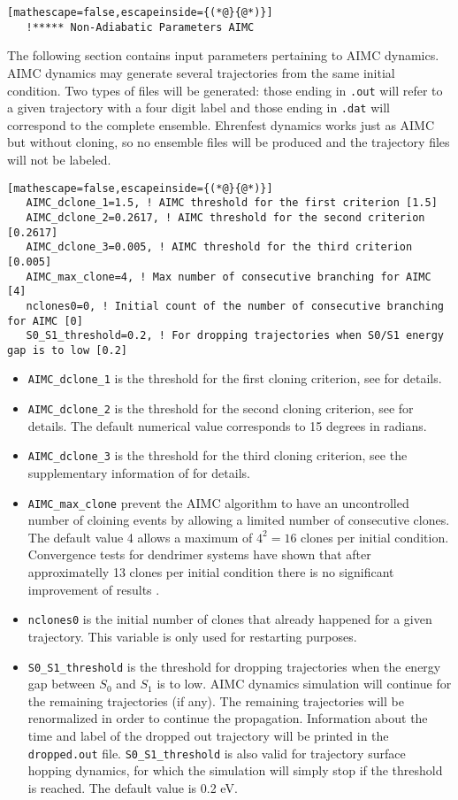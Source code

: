\begin{lstlisting}[mathescape=false,escapeinside={(*@}{@*)}]
   !***** Non-Adiabatic Parameters AIMC
\end{lstlisting}
\noindent The following section contains input parameters pertaining to AIMC dynamics. AIMC dynamics may generate several trajectories from the same initial condition. Two types of files will be generated: those ending in \verb+.out+ will refer to a given trajectory with a four digit label and those ending in \verb+.dat+ will correspond to the complete ensemble. Ehrenfest dynamics works just as AIMC but without cloning, so no ensemble files will be produced and the trajectory files will not be labeled.
\begin{lstlisting}[mathescape=false,escapeinside={(*@}{@*)}]
   AIMC_dclone_1=1.5, ! AIMC threshold for the first criterion [1.5]
   AIMC_dclone_2=0.2617, ! AIMC threshold for the second criterion [0.2617]
   AIMC_dclone_3=0.005, ! AIMC threshold for the third criterion [0.005]
   AIMC_max_clone=4, ! Max number of consecutive branching for AIMC [4]
   nclones0=0, ! Initial count of the number of consecutive branching for AIMC [0]
   S0_S1_threshold=0.2, ! For dropping trajectories when S0/S1 energy gap is to low [0.2]
\end{lstlisting}
\begin{itemize}
    \item \verb+AIMC_dclone_1+ is the threshold for the first cloning criterion, see \cite{freixas2018ab} for details.
    \item \verb+AIMC_dclone_2+ is the threshold for the second cloning criterion, see \cite{freixas2018ab} for details. The default numerical value corresponds to 15 degrees in radians.
    \item \verb+AIMC_dclone_3+ is the threshold for the third cloning criterion, see the supplementary information of \cite{lemus2022ultrafast} for details.
    \item \verb+AIMC_max_clone+ prevent the AIMC algorithm to have an uncontrolled number of cloining events by allowing a limited number of consecutive clones. The default value 4 allows a maximum of $4^2=16$ clones per initial condition. Convergence tests for dendrimer systems have shown that after approximatelly 13 clones per initial condition there is no significant improvement of results \cite{freixas2021nonadiabatic}.
    \item \verb+nclones0+ is the initial number of clones that already happened for a given trajectory. This variable is only used for restarting purposes.
    \item \verb+S0_S1_threshold+ is the threshold for dropping trajectories when the energy gap between $S_0$ and $S_1$ is to low. AIMC dynamics simulation will continue for the remaining trajectories (if any). The remaining trajectories will be renormalized in order to continue the propagation. Information about the time and label of the dropped out trajectory will be printed in the \verb+dropped.out+ file. \verb+S0_S1_threshold+ is also valid for trajectory surface hopping dynamics, for which the simulation will simply stop if the threshold is reached. The default value is 0.2 eV.
\end{itemize}

